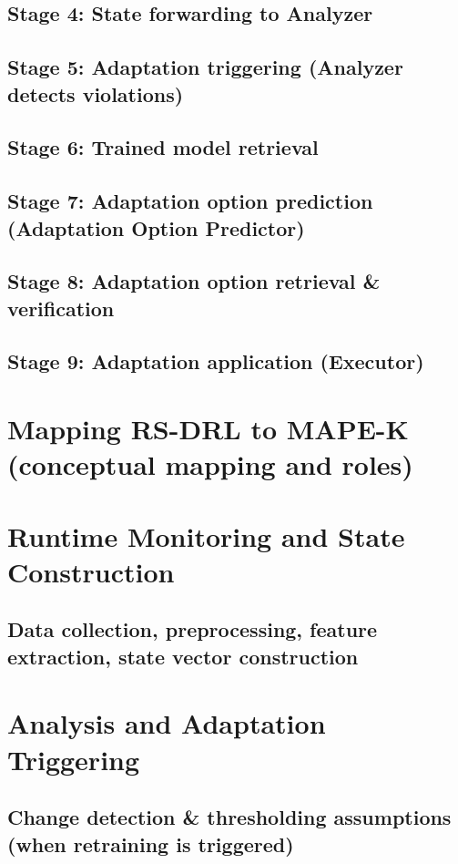 \documentclass[11pt,a4paper]{article}
\begin{document}
\subsection{Stage 4: State forwarding to Analyzer}
\subsection{Stage 5: Adaptation triggering (Analyzer detects violations)}
\subsection{Stage 6: Trained model retrieval}
\subsection{Stage 7: Adaptation option prediction (Adaptation Option Predictor)}
\subsection{Stage 8: Adaptation option retrieval \& verification}
\subsection{Stage 9: Adaptation application (Executor)}

\section{Mapping RS-DRL to MAPE-K (conceptual mapping and roles)}

\section{Runtime Monitoring and State Construction}
\subsection{Data collection, preprocessing, feature extraction, state vector construction}

\section{Analysis and Adaptation Triggering}
\subsection{Change detection \& thresholding assumptions (when retraining is triggered)}
\end{document}
